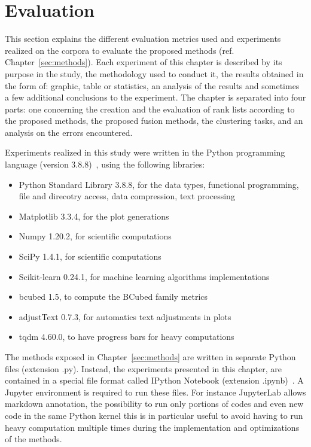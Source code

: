 \section{Evaluation \label{sec:evaluation}}

This section explains the different evaluation metrics used and experiments realized on the corpora to evaluate the proposed methods (ref. Chapter~\ref{sec:methods}).
Each experiment of this chapter is described by its purpose in the study, the methodology used to conduct it, the results obtained in the form of: graphic, table or statistics, an analysis of the results and sometimes a few additional conclusions to the experiment.
The chapter is separated into four parts: one concerning the creation and the evaluation of rank lists according to the proposed methods, the proposed fusion methods, the clustering tasks, and an analysis on the errors encountered.

Experiments realized in this study were written in the Python programming language (version 3.8.8)~\cite{python}, using the following libraries:
\begin{itemize}
  \item Python Standard Library 3.8.8, for the data types, functional programming, file and direcotry access, data compression, text processing~\cite{python_standard_library}
  \item Matplotlib 3.3.4, for the plot generations~\cite{matplotlib}
  \item Numpy 1.20.2, for scientific computations~\cite{numpy}
  \item SciPy 1.4.1, for scientific computations~\cite{scipy}
  \item Scikit-learn 0.24.1, for machine learning algorithms implementations~\cite{sklearn}
  \item bcubed 1.5, to compute the BCubed family metrics~\cite{bcubed_gh}
  \item adjustText 0.7.3, for automatics text adjustments in plots~\cite{adjustText}
  \item tqdm 4.60.0, to have progress bars for heavy computations~\cite{tqdm}
\end{itemize}
The methods exposed in Chapter~\ref{sec:methods} are written in separate Python files (extension .py).
Instead, the experiments presented in this chapter, are contained in a special file format called IPython Notebook (extension .ipynb)~\cite{jupyter}.
A Jupyter environment is required to run these files.
For instance JupyterLab allows markdown annotation, the possibility to run only portions of codes and even new code in the same Python kernel this is in particular useful to avoid having to run heavy computation multiple times during the implementation and optimizations of the methods.








